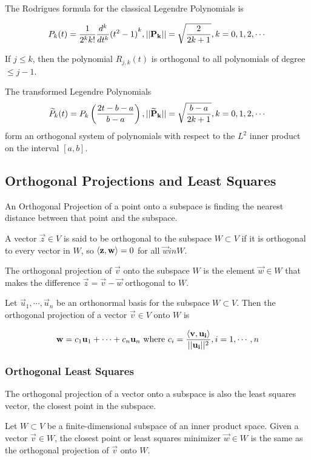     The Rodrigues formula for the classical Legendre Polynomials is

        \[ P_k(t) = \frac{1}{2^k k!} \frac{d^k}{dt^k} {(t^2 - 1)}^k, \lvert \lvert \mathbf{P_k} \rvert \rvert = \sqrt{\frac{2}{2k + 1}}, k = 0, 1, 2, \cdots \]

    If $j \le k$, then the polynomial $R_{j,k}(t)$ is orthogonal to all polynomials of degree $\le j - 1$.

    The transformed Legendre Polynomials \[ \widetilde{P}_k(t) = P_k \left( \frac{2t - b - a}{b - a} \right), \lvert \lvert \mathbf{\widetilde{P}_k} \rvert \rvert = \sqrt{\frac{b-a}{2k + 1}}, k=0, 1, 2, \cdots \] form an orthogonal system of polynomials with respect to the $L^2$ inner product on the interval $[a, b]$.

    \subsection{Orthogonal Projections and Least Squares}
    An Orthogonal Projection of a point onto a subspace is finding the nearest distance between that point and the subspace.

    A vector $\vec{z} \in V$ is said to be orthogonal to the subspace $W \subset V$ if it is orthogonal to every vector in $W$, so $\left\langle \mathbf{z}, \mathbf{w} \right\rangle = 0$ for all $\vec{w} in W$.

    The orthogonal projection of $\vec{v}$ onto the subspace $W$ is the element $\vec{w} \in W$ that makes the difference $\vec{z} = \vec{v} - \vec{w}$ orthogonal to $W$.

    Let $\vec{u}_1, \cdots, \vec{u}_n$ be an orthonormal basis for the subspace $W \subset V$. Then the orthogonal projection of a vector $\vec{v} \in V$ onto $W$ is

        \[ \mathbf{w} = c_1 \mathbf{u}_1 + \cdots + c_n \mathbf{u}_n \text{ where } c_i = \frac{\left\langle \mathbf{v}, \mathbf{u_i} \right\rangle}{\lvert \lvert \mathbf{u_i} \rvert \rvert^2}, i = 1, \cdots, n \]

        \subsubsection{Orthogonal Least Squares}
        The orthogonal projection of a vector onto a subspace is also the least squares vector, the closest point in the subspace.

        Let $W \subset V$ be a finite-dimensional subspace of an inner product space. Given a vector $\vec{v} \in W$, the closest point or least squares minimizer $\vec{w} \in W$ is the same as the orthogonal projection of $\vec{v}$ onto $W$.

